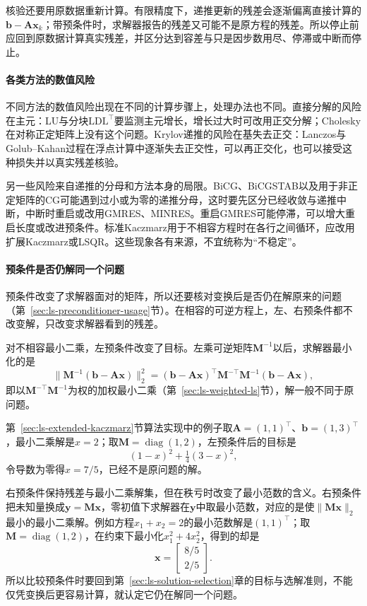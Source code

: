 核验还要用原数据重新计算。有限精度下，递推更新的残差会逐渐偏离直接计算的$\bm b-\bm A\bm x_k$；带预条件时，求解器报告的残差又可能不是原方程的残差。所以停止前应回到原数据计算真实残差，并区分达到容差与只是因步数用尽、停滞或中断而停止。

\paragraph{各类方法的数值风险}
不同方法的数值风险出现在不同的计算步骤上，处理办法也不同。直接分解的风险在主元：LU与分块$\mathrm{LDL}^\top$要监测主元增长，增长过大时可改用正交分解；Cholesky在对称正定矩阵上没有这个问题。Krylov递推的风险在基失去正交：Lanczos与Golub--Kahan过程在浮点计算中逐渐失去正交性，可以再正交化，也可以接受这种损失并以真实残差核验。

另一些风险来自递推的分母和方法本身的局限。BiCG、BiCGSTAB以及用于非正定矩阵的CG可能遇到过小或为零的递推分母，这时要先区分已经收敛与递推中断，中断时重启或改用GMRES、MINRES。重启GMRES可能停滞，可以增大重启长度或改进预条件。标准Kaczmarz用于不相容方程时在各行之间循环，应改用扩展Kaczmarz或LSQR。这些现象各有来源，不宜统称为“不稳定”。

\paragraph{预条件是否仍解同一个问题}
预条件改变了求解器面对的矩阵，所以还要核对变换后是否仍在解原来的问题（第~\ref{sec:ls-preconditioner-usage}节）。在相容的可逆方程上，左、右预条件都不改变解，只改变求解器看到的残差。

对不相容最小二乘，左预条件改变了目标。左乘可逆矩阵$\bm M^{-1}$以后，求解器最小化的是
\begin{equation}
 \lVert\bm M^{-1}(\bm b-\bm A\bm x)\rVert_2^2=(\bm b-\bm A\bm x)^\top\bm M^{-\top}\bm M^{-1}(\bm b-\bm A\bm x),
 \label{eq:ls-left-preconditioned-objective}
\end{equation}
即以$\bm M^{-\top}\bm M^{-1}$为权的加权最小二乘（第~\ref{sec:ls-weighted-ls}节），解一般不同于原问题。

第~\ref{sec:ls-extended-kaczmarz}节算法实现中的例子取$\bm A=(1,1)^\top$、$\bm b=(1,3)^\top$，最小二乘解是$x=2$；取$\bm M=\operatorname{diag}(1,2)$，左预条件后的目标是
\[
 (1-x)^2+\tfrac14(3-x)^2 ,
\]
令导数为零得$x=7/5$，已经不是原问题的解。

右预条件保持残差与最小二乘解集，但在秩亏时改变了最小范数的含义。右预条件把未知量换成$\bm y=\bm M\bm x$，零初值下求解器在$\bm y$中取最小范数，对应的是使$\lVert\bm M\bm x\rVert_2$最小的最小二乘解。例如方程$x_1+x_2=2$的最小范数解是$(1,1)^\top$；取$\bm M=\operatorname{diag}(1,2)$，在约束下最小化$x_1^2+4x_2^2$，得到的却是
\[
 \bm x=\begin{bmatrix}8/5\\2/5\end{bmatrix}.
\]
所以比较预条件时要回到第~\ref{sec:ls-solution-selection}章的目标与选解准则，不能仅凭变换后更容易计算，就认定它仍在解同一个问题。

